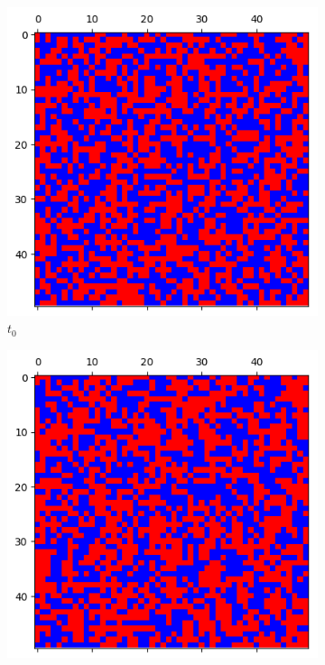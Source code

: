 \documentclass[letterpaper]{article}
\begin{document}
\begin{figure}
    \begin{subfigure}{.33\textwidth}
      \centering
      \includegraphics[width=1\linewidth]{images/assign2/visu_50-part2/t0}
      \caption{$t_0$}
      \label{fig:t0_50part2}
    \end{subfigure}
    \begin{subfigure}{.33\textwidth}
      \centering
      \includegraphics[width=1\linewidth]{images/assign2/visu_50-part2/t1}

\end{subfigure}
\end{figure}
\end{document}
